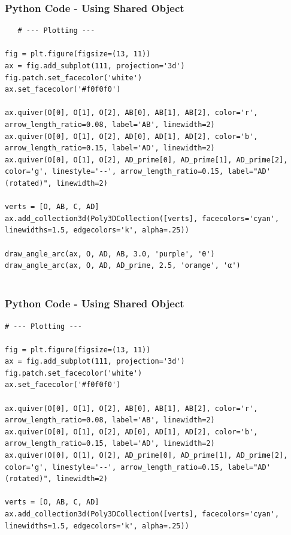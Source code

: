 \documentclass{beamer}
\begin{document}
\begin{frame}[fragile]
     \frametitle{Python Code - Using Shared Object}
     \begin{lstlisting}
   # --- Plotting ---

fig = plt.figure(figsize=(13, 11))
ax = fig.add_subplot(111, projection='3d')
fig.patch.set_facecolor('white')
ax.set_facecolor('#f0f0f0')

ax.quiver(O[0], O[1], O[2], AB[0], AB[1], AB[2], color='r', arrow_length_ratio=0.08, label='AB', linewidth=2)
ax.quiver(O[0], O[1], O[2], AD[0], AD[1], AD[2], color='b', arrow_length_ratio=0.15, label='AD', linewidth=2)
ax.quiver(O[0], O[1], O[2], AD_prime[0], AD_prime[1], AD_prime[2], color='g', linestyle='--', arrow_length_ratio=0.15, label="AD' (rotated)", linewidth=2)

verts = [O, AB, C, AD]
ax.add_collection3d(Poly3DCollection([verts], facecolors='cyan', linewidths=1.5, edgecolors='k', alpha=.25))

draw_angle_arc(ax, O, AD, AB, 3.0, 'purple', 'θ')
draw_angle_arc(ax, O, AD, AD_prime, 2.5, 'orange', 'α')


     \end{lstlisting}
     \end{frame}

\begin{frame}[fragile]
     \frametitle{Python Code - Using Shared Object}
     \begin{lstlisting}
# --- Plotting ---

fig = plt.figure(figsize=(13, 11))
ax = fig.add_subplot(111, projection='3d')
fig.patch.set_facecolor('white')
ax.set_facecolor('#f0f0f0')

ax.quiver(O[0], O[1], O[2], AB[0], AB[1], AB[2], color='r', arrow_length_ratio=0.08, label='AB', linewidth=2)
ax.quiver(O[0], O[1], O[2], AD[0], AD[1], AD[2], color='b', arrow_length_ratio=0.15, label='AD', linewidth=2)
ax.quiver(O[0], O[1], O[2], AD_prime[0], AD_prime[1], AD_prime[2], color='g', linestyle='--', arrow_length_ratio=0.15, label="AD' (rotated)", linewidth=2)

verts = [O, AB, C, AD]
ax.add_collection3d(Poly3DCollection([verts], facecolors='cyan', linewidths=1.5, edgecolors='k', alpha=.25))



     \end{lstlisting}
     \end{frame}
\end{document}
